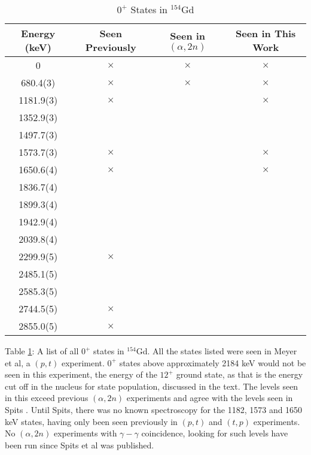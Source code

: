 \begin{table}
    \centering
    \begin{ThreePartTable}
        \caption{$0^+$ States in $^{154}$Gd}
        \label{tab:0plus_154}
    \begin{tabular}{c|c|c|c}
        Energy (keV) & Seen Previously \citep{meyer06:_zeroplus} & Seen in $(\alpha,2n)$ & Seen in This Work  \\
        \toprule
        0 & $\times$ & $\times$ & $\times$\\
        680.4(3) & $\times$ & $\times$ & $\times$\\
        1181.9(3) & $\times$ &  & $\times$\\
        1352.9(3) & & &\\
        1497.7(3) & & &\\
        1573.7(3) & $\times$ &  & $\times$\\
        1650.6(4) & $\times$ &  & $\times$\\
        1836.7(4) & & &\\
        1899.3(4) & & &\\
        1942.9(4) & & &\\
        2039.8(4) & & &\\
        2299.9(5) & $\times$ & &\\
        2485.1(5) & & &\\
        2585.3(5) & & &\\
        2744.5(5) & $\times$ & &\\
        2855.0(5) & $\times$ & &\\
        \bottomrule
    \end{tabular}
    \makeatletter\def\TPT@hsize{}\makeatletter
        \begin{tablenotes}[para]
        Table \ref{tab:0plus_154}: A list of all $0^+$ states in $^{154}$Gd. All the states listed were seen in Meyer et al, a $(p,t)$ experiment\citep{meyer06:_zeroplus}. $0^+$ states above approximately 2184 keV would not be seen in this experiment, the energy of the $12^+$ ground state, as that is the energy cut off in the nucleus for state population, discussed in the text. The levels seen in this exceed previous $(\alpha,2n)$ experiments and agree with the levels seen in Spits \citep{spits96:_154gd}. Until Spits, there was no known spectroscopy for the 1182, 1573 and 1650 keV states, having only been seen previously in $(p,t)$ and $(t,p)$ experiments. No $(\alpha,2n)$ experiments with $\gamma-\gamma$ coincidence, looking for such levels have been run since Spits et al was published.
        \end{tablenotes}
\end{ThreePartTable}
\end{table}